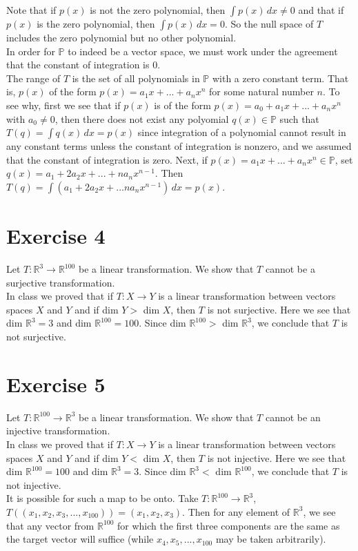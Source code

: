 \documentclass[11pt]{article}
\begin{document}
Note that if $p(x)$ is not the zero polynomial, then $\int p(x) \, dx \neq 0$ and that if $p(x)$ is the zero polynomial, then $\int p(x) \, dx = 0$. So the null space of $T$ includes the zero polynomial but no other polynomial. \\

In order for $\mathbb{P}$ to indeed be a vector space, we must work under the agreement that the constant of integration is 0. \\

The range of $T$ is the set of all polynomials in $\mathbb{P}$ with a zero constant term. That is, $p(x)$ of the form $p(x) = a_1x +...+a_nx^n$ for some natural number $n$. To see why, first we see that if $p(x)$ is of the form $p(x) = a_0 +a_1x+...+a_nx^n$ with $a_0 \neq 0$, then there does not exist any polyomial $q(x) \in \mathbb{P}$ such that $T(q) = \int q(x) \, dx = p(x)$ since integration of a polynomial cannot result in any constant terms unless the constant of integration is nonzero, and we assumed that the constant of integration is zero. Next, if $p(x) = a_1x+...+a_nx^n \in \mathbb{P}$, set $q(x) = a_1 + 2a_2x +...+na_nx^{n-1}$. Then $T(q) = \int (a_1 + 2a_2x +... na_nx^{n-1})\, dx = p(x)$.

\section*{Exercise 4}

Let $T: \mathbb{R}^3 \rightarrow \mathbb{R}^{100}$ be a linear transformation. We show that $T$ cannot be a surjective transformation. \\

In class we proved that if $T : X \rightarrow Y$ is a linear transformation between vectors spaces $X$ and $Y$ and if dim $Y >$ dim $X$, then $T$ is not surjective. Here we see that dim $\mathbb{R}^3 = 3$ and dim $\mathbb{R}^{100} = 100$. Since dim $\mathbb{R}^{100} >$ dim $\mathbb{R}^3$, we conclude that $T$ is not surjective. 


\section*{Exercise 5}

Let $T: \mathbb{R}^{100} \rightarrow \mathbb{R}^3$ be a linear transformation. We show that $T$ cannot be an injective transformation. \\

In class we proved that if $T : X \rightarrow Y$ is a linear transformation between vectors spaces $X$ and $Y$ and if dim $Y <$ dim $X$, then $T$ is not injective. Here we see that dim $\mathbb{R}^{100} = 100$ and dim $\mathbb{R}^3 = 3$. Since dim $\mathbb{R}^3 <$ dim $\mathbb{R}^{100}$, we conclude that $T$ is not injective. \\

It is possible for such a map to be onto. Take $T : \mathbb{R}^{100} \rightarrow \mathbb{R}^3$, $T((x_1,x_2,x_3,...,x_{100})) = (x_1,x_2,x_3)$. Then for any element of $\mathbb{R}^3$, we see that any vector from $\mathbb{R}^{100}$ for which the first three components are the same as the target vector will suffice (while $x_4,x_5,...,x_{100}$ may be taken arbitrarily). 
\end{document}
